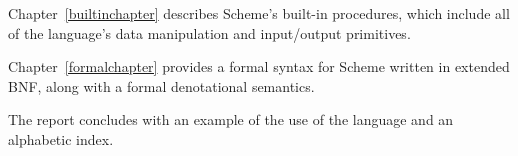 \vest Chapter~\ref{builtinchapter} describes Scheme's built-in
procedures, which include all of the language's data manipulation and
input/output primitives.

\vest Chapter~\ref{formalchapter} provides a formal syntax for Scheme
written in extended BNF, along with a formal denotational semantics.

\vest The report concludes with an example of the use of the language and an
alphabetic index.



\vfill
\eject

\tableofcontents

\vfill
\eject
